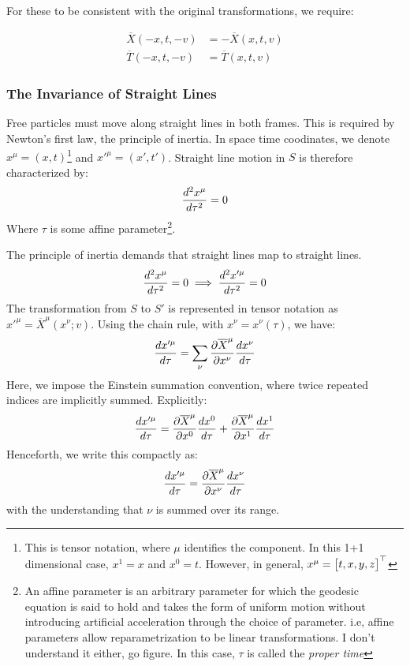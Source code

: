 		For these to be consistent with the original transformations, we require:

		\begin{equation}
			\begin{aligned}
				\overline{X}(-x, t, -v) &= -\overline{X}(x, t, v) \\
				\overline{T}(-x, t, -v) &= \overline{T}(x, t, v)
			\end{aligned}
			\label{eq:parity-conditions}
		\end{equation}

	\subsubsection{The Invariance of Straight Lines}
		Free particles must move along straight lines in both frames. This is required
		by Newton's first law, the principle of inertia. In space time coodinates, we denote
		$x^\mu = (x,t)$\footnote{This is tensor notation, where $\mu$ identifies the component.
		In this 1+1 dimensional case, $x^1=x$ and $x^0 = t$. However, in general, $x^\mu=\bmqty{t,x,y,z}^\top$}
		and $x'^\mu = (x',t')$. Straight line motion in $S$ is therefore characterized by:
		\begin{equation}
			\dv[2]{x^\mu}{\tau} = 0 
		\end{equation}
		Where $\tau$ is some affine parameter\footnote{An affine parameter is an arbitrary parameter for which
		the geodesic equation is said to hold and takes the form of uniform motion without introducing artificial
		acceleration through the choice of parameter. i.e, affine parameters allow 
		reparametrization to be linear transformations. I don't understand it either, go figure. In this case, $\tau$ is called
		the \textit{proper time}}.

		The principle of inertia demands that straight lines map to straight lines.
		\begin{equation}
			\dv[2]{x^\mu}{\tau} = 0 \implies \dv[2]{x'^\mu}{\tau} = 0  
		\end{equation}
		The transformation from $S$ to $S'$ is represented in tensor notation as $x'^\mu = \overline{X}^\mu(x^\nu; v)$. Using the chain rule, with $x^\nu = x^\nu(\tau)$, we have:
		\begin{equation}
			\dv{x'^\mu}{\tau} = \sum_\nu \pdv{\overline{X}^\mu}{x^\nu} \dv{x^\nu}{\tau}
			\label{eq:chain-rule-first}
		\end{equation}
		Here, we impose the Einstein summation convention, where twice repeated indices are implicitly summed. 
		Explicitly:
		\begin{equation}
			\dv{x'^\mu}{\tau} = \pdv{\overline{X}^\mu}{x^0} \dv{x^0}{\tau} + \pdv{\overline{X}^\mu}{x^1} \dv{x^1}{\tau}
		\end{equation}
		Henceforth, we write this compactly as:
		\begin{equation}
			\dv{x'^\mu}{\tau} = \pdv{\overline{X}^\mu}{x^\nu} \dv{x^\nu}{\tau}
		\end{equation}
		with the understanding that $\nu$ is summed over its range. 

